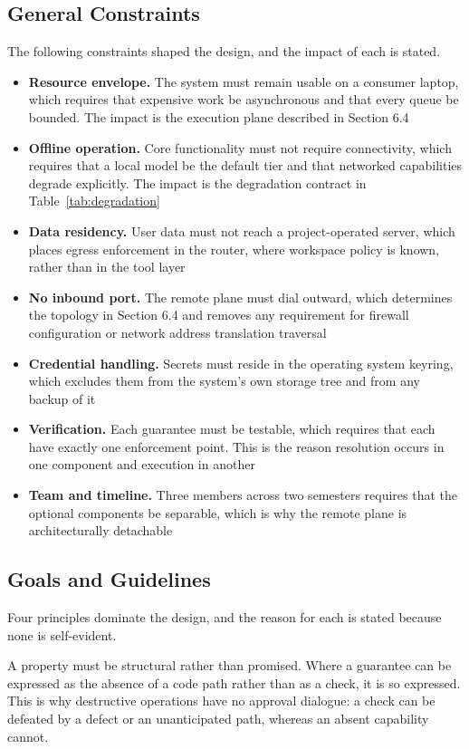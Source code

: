 \documentclass{FastFyp}
\begin{document}
\subsection{General Constraints}
The following constraints shaped the design, and the impact of each is stated.

\begin{itemize}
    \item \textbf{Resource envelope.} The system must remain usable on a consumer laptop, which requires that expensive work be asynchronous and that every queue be bounded. The impact is the execution plane described in Section 6.4
    \item \textbf{Offline operation.} Core functionality must not require connectivity, which requires that a local model be the default tier and that networked capabilities degrade explicitly. The impact is the degradation contract in Table~\ref{tab:degradation}
    \item \textbf{Data residency.} User data must not reach a project-operated server, which places egress enforcement in the router, where workspace policy is known, rather than in the tool layer
    \item \textbf{No inbound port.} The remote plane must dial outward, which determines the topology in Section 6.4 and removes any requirement for firewall configuration or network address translation traversal
    \item \textbf{Credential handling.} Secrets must reside in the operating system keyring, which excludes them from the system's own storage tree and from any backup of it
    \item \textbf{Verification.} Each guarantee must be testable, which requires that each have exactly one enforcement point. This is the reason resolution occurs in one component and execution in another
    \item \textbf{Team and timeline.} Three members across two semesters requires that the optional components be separable, which is why the remote plane is architecturally detachable
\end{itemize}

\subsection{Goals and Guidelines}
Four principles dominate the design, and the reason for each is stated because none is self-evident.

A property must be structural rather than promised. Where a guarantee can be expressed as the absence of a code path rather than as a check, it is so expressed. This is why destructive operations have no approval dialogue: a check can be defeated by a defect or an unanticipated path, whereas an absent capability cannot.
\end{document}
